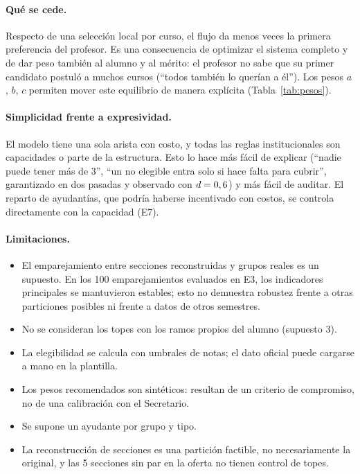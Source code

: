 \documentclass{article}
\begin{document}
\paragraph{Qué se cede.} Respecto de una selección local por curso, el flujo da menos veces la primera preferencia del profesor. Es una consecuencia de optimizar el sistema completo y de dar peso también al alumno y al mérito: el profesor no sabe que su primer candidato postuló a muchos cursos (``todos también lo querían a él''). Los pesos $a$, $b$, $c$ permiten mover este equilibrio de manera explícita (Tabla~\ref{tab:pesos}).

\paragraph{Simplicidad frente a expresividad.} El modelo tiene una sola arista con costo, y todas las reglas institucionales son capacidades o parte de la estructura. Esto lo hace más fácil de explicar (``nadie puede tener más de 3'', ``un no elegible entra solo si hace falta para cubrir'', garantizado en dos pasadas y observado con $d = 0,6$) y más fácil de auditar. El reparto de ayudantías, que podría haberse incentivado con costos, se controla directamente con la capacidad (E7).

\paragraph{Limitaciones.}
\begin{itemize}
    \item El emparejamiento entre secciones reconstruidas y grupos reales es un supuesto. En los 100 emparejamientos evaluados en E3, los indicadores principales se mantuvieron estables; esto no demuestra robustez frente a otras particiones posibles ni frente a datos de otros semestres.
    \item No se consideran los topes con los ramos propios del alumno (supuesto 3).
    \item La elegibilidad se calcula con umbrales de notas; el dato oficial puede cargarse a mano en la plantilla.
    \item Los pesos recomendados son sintéticos: resultan de un criterio de compromiso, no de una calibración con el Secretario.
    \item Se supone un ayudante por grupo y tipo.
    \item La reconstrucción de secciones es una partición factible, no necesariamente la original, y las 5 secciones sin par en la oferta no tienen control de topes.
\end{itemize}
\end{document}

